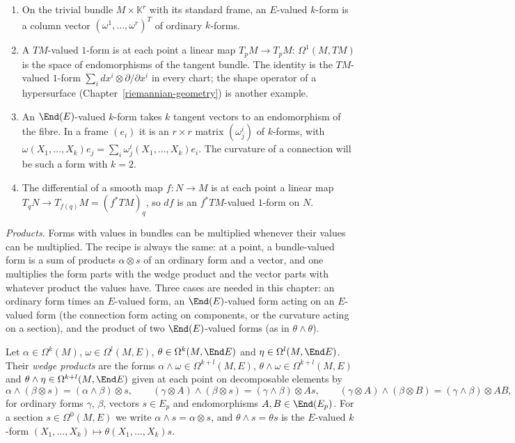 \begin{example}\label{connections:example-bundle-valued-forms}
\begin{enumerate}
\item On the trivial bundle $M \times \mathbb{K}^r$ with its standard frame, an $E$-valued $k$-form is a column vector $(\omega^1, \ldots, \omega^r)^T$ of ordinary $k$-forms.
\item A $TM$-valued $1$-form is at each point a linear map $T_pM \to T_pM$: $\Omega^1(M, TM)$ is the space of endomorphisms of the tangent bundle. The identity is the
$TM$-valued $1$-form $\sum_idx^i \otimes \partial/\partial x^i$ in every chart; the shape operator of a hypersurface (Chapter~\ref{riemannian-geometry}) is another example.
\item An $\End(E)$-valued $k$-form takes $k$ tangent vectors to an endomorphism of the fibre. In a frame $(e_i)$ it is an $r \times r$ matrix $(\omega^i_j)$ of $k$-forms, with
$\omega(X_1, \ldots, X_k)e_j = \sum_i\omega^i_j(X_1, \ldots, X_k)e_i$. The curvature of a connection will be such a form with $k = 2$.
\item The differential of a smooth map $f \colon N \to M$ is at each point a linear map $T_qN \to T_{f(q)}M = (f^*TM)_q$, so $df$ is an $f^*TM$-valued $1$-form on $N$.
\end{enumerate}
\end{example}

\emph{Products.} Forms with values in bundles can be multiplied whenever their values can be multiplied. The recipe is always the same: at a point, a bundle-valued form is a sum of
products $\alpha \otimes s$ of an ordinary form and a vector, and one multiplies the form parts with the wedge product and the vector parts with whatever product the values have. Three
cases are needed in this chapter: an ordinary form times an $E$-valued form, an $\End(E)$-valued form acting on an $E$-valued form (the connection form acting on components, or the
curvature acting on a section), and the product of two $\End(E)$-valued forms (as in $\theta \wedge \theta$).

\begin{definition}\label{connections:definition-products}
Let $\alpha \in \Omega^k(M)$, $\omega \in \Omega^l(M, E)$, $\theta \in \Omega^k(M, \End E)$ and $\eta \in \Omega^l(M, \End E)$. Their \emph{wedge products} are the forms
$\alpha \wedge \omega \in \Omega^{k+l}(M, E)$, $\theta \wedge \omega \in \Omega^{k+l}(M, E)$ and $\theta \wedge \eta \in \Omega^{k+l}(M, \End E)$ given at each point on decomposable elements by
\[
\alpha \wedge (\beta \otimes s) = (\alpha \wedge \beta) \otimes s, \qquad (\gamma \otimes A) \wedge (\beta \otimes s) = (\gamma \wedge \beta) \otimes As, \qquad (\gamma \otimes A) \wedge (\beta \otimes B) = (\gamma \wedge \beta) \otimes AB,
\]
for ordinary forms $\gamma$, $\beta$, vectors $s \in E_p$ and endomorphisms $A, B \in \End(E_p)$. For a section $s \in \Omega^0(M, E)$ we write $\alpha \wedge s = \alpha \otimes s$, and $\theta \wedge s = \theta s$
is the $E$-valued $k$-form $(X_1, \ldots, X_k) \mapsto \theta(X_1, \ldots, X_k)s$.
\end{definition}

